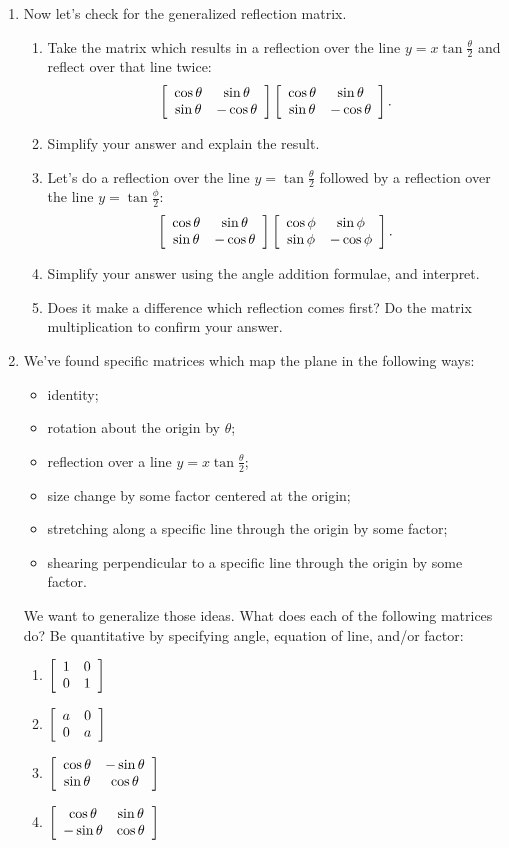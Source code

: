 \documentclass[../gatm.tex]{subfiles}
\begin{document}
\begin{enumerate}
\begin{enumerate}
\end{enumerate}
\item Now let's check for the generalized reflection matrix.
\begin{enumerate}
\item Take the matrix which results in a reflection over the line $y=x\tan \frac{\theta}{2}$ and reflect over that line twice: $$\left[\begin{array}{cc} \cos\theta & \sin\theta \\ \sin\theta & -\cos\theta \end{array}\right]\left[\begin{array}{cc} \cos\theta & \sin\theta \\ \sin\theta & -\cos\theta \end{array}\right].$$
\item Simplify your answer and explain the result.
\item Let's do a reflection over the line $y=\tan\frac{\theta}{2}$ followed by a reflection over the line $y=\tan\frac{\phi}{2}$:
$$\left[\begin{array}{cc} \cos\theta & \sin\theta \\ \sin\theta & -\cos\theta \end{array}\right]\left[\begin{array}{cc} \cos\phi & \sin\phi \\ \sin\phi & -\cos\phi \end{array}\right].$$
\item Simplify your answer using the angle addition formulae, and interpret.
\item Does it make a difference which reflection comes first? Do the matrix multiplication to confirm your answer.
\end{enumerate}
\item We've found specific matrices which map the plane in the following ways:
\begin{itemize}
\item identity;
\item rotation about the origin by $\theta$;
\item reflection over a line $y=x \tan\frac{\theta}{2}$;
\item size change by some factor centered at the origin;
\item stretching along a specific line through the origin by some factor;
\item shearing perpendicular to a specific line through the origin by some factor.
\end{itemize}
We want to generalize those ideas. What does each of the following matrices do? Be quantitative by specifying angle, equation of line, and/or factor:\label{prob:list_transformations}
\begin{multicols}{3}
\begin{enumerate}
\item $\left[\begin{array}{cc} 1 & 0 \\ 0 & 1 \end{array}\right]$ \label{prob:list_transformations_part_start}
\item $\left[\begin{array}{cc} a & 0 \\ 0 & a \end{array}\right]$
\item $\left[\begin{array}{cc} \cos\theta & -\sin\theta \\ \sin\theta & \cos\theta \end{array}\right]$
\item $\left[\begin{array}{cc} \cos\theta & \sin\theta \\ -\sin\theta & \cos\theta \end{array}\right]$

\end{enumerate}
\end{multicols}
\end{enumerate}
\end{document}
